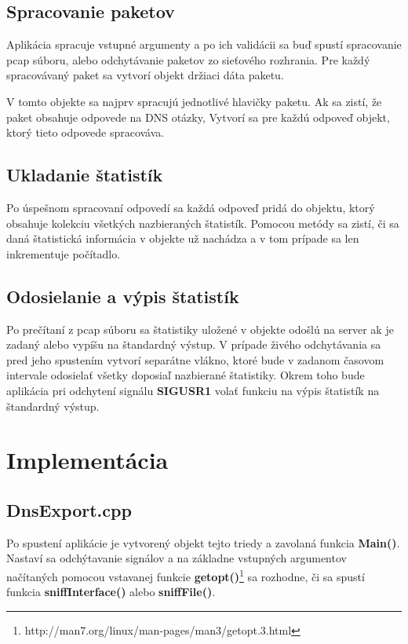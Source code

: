 \documentclass{article}
\begin{document}
        \subsection{Spracovanie paketov}
        Aplikácia spracuje vstupné argumenty a po ich validácii sa buď spustí spracovanie pcap súboru, alebo odchytávanie
        paketov zo sieťového rozhrania. Pre každý spracovávaný paket sa vytvorí objekt držiaci dáta paketu.

        V tomto objekte sa najprv spracujú jednotlivé hlavičky paketu. Ak sa zistí, že paket obsahuje odpovede na DNS otázky,
        Vytvorí sa pre každú odpoveď objekt, ktorý tieto odpovede spracováva.

        \subsection{Ukladanie štatistík}
        Po úspešnom spracovaní odpovedí sa každá odpoveď pridá do objektu, ktorý obsahuje kolekciu všetkých nazbieraných štatistík.
        Pomocou metódy sa zistí, či sa daná štatistická informácia v objekte už nachádza a v tom prípade sa len inkrementuje počítadlo.
        
        \subsection{Odosielanie a výpis štatistík}
        Po prečítaní z pcap súboru sa štatistiky uložené v objekte odošlú na server ak je zadaný alebo vypíšu na štandardný výstup.
        V prípade živého odchytávania sa pred jeho spustením vytvorí separátne vlákno, ktoré bude v zadanom časovom intervale
        odosielať všetky doposiaľ nazbierané štatistiky. Okrem toho bude aplikácia pri odchytení signálu \textbf{SIGUSR1} volať funkciu
        na výpis štatistík na štandardný výstup.
        
    \newpage

    \section{Implementácia}
    
        \subsection{DnsExport.cpp}
        Po spustení aplikácie je vytvorený objekt tejto triedy a zavolaná funkcia \textbf{Main()}. Nastaví sa odchýtavanie signálov
        a na základne vstupných argumentov načítaných pomocou vstavanej funkcie \textbf{getopt()}\footnote{http://man7.org/linux/man-pages/man3/getopt.3.html} sa rozhodne, či sa spustí funkcia
        \textbf{sniffInterface()} alebo \textbf{sniffFile()}. 
        
\end{document}
